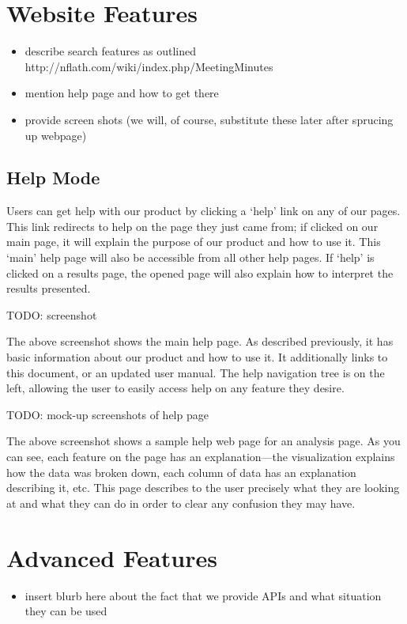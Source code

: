 \documentclass[titlepage]{article}
\begin{document}
\section{Website Features}
\begin{itemize}
\setlength{\itemsep}{-1mm}
\item describe search features as outlined
http://nflath.com/wiki/index.php/MeetingMinutes
\item mention help page and how to get there
\item provide screen shots (we will, of course, substitute these later after
sprucing up webpage)
\end{itemize}

\subsection{Help Mode}
Users can get help with our product by clicking a `help' link on any of our
pages.  This link redirects to help on the page they just came from; if
clicked on our main page, it will explain the purpose of our product and how
to use it.  This `main' help page will also be accessible from all other help
pages.  If `help' is clicked on a results page, the opened page will also
explain how to interpret the results presented.

    TODO: screenshot

The above screenshot shows the main help page.  As described previously, it
has basic information about our product and how to use it.  It additionally
links to this document, or an updated user manual.  The help navigation tree
is on the left, allowing the user to easily access help on any feature they
desire.

    TODO: mock-up screenshots of help page

The above screenshot shows a sample help web page for an analysis page.  As
you can see, each feature on the page has an explanation---the visualization
explains how the data was broken down, each column of data has an explanation
describing it, etc.  This page describes to the user precisely what they are
looking at and what they can do in order to clear any confusion they may
have.

\section{Advanced Features}
\begin{itemize}
\item insert blurb here about the fact that we provide APIs and what situation
they can be used
\end{itemize}
\end{document}
